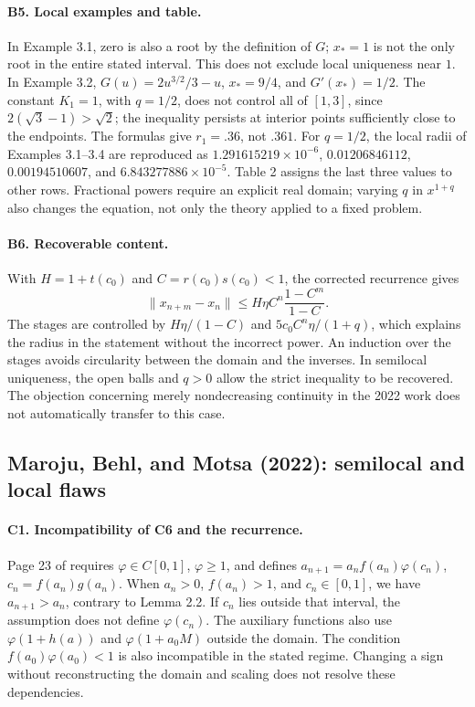 \documentclass[11pt,a4paper]{article}
\numberwithin{equation}{section}
\numberwithin{table}{section}
\theoremstyle{plain}
\theoremstyle{definition}\newtheorem{definition}[theorem]{Definition}
\theoremstyle{remark}\newtheorem{remark}[theorem]{Remark}
\begin{document}
\paragraph{B5. Local examples and table.}
In Example 3.1, zero is also a root by the definition of $G$;
$x_*=1$ is not the only root in the entire stated interval. This does
not exclude local uniqueness near $1$. In Example 3.2,
$G(u)=2u^{3/2}/3-u$, $x_*=9/4$, and $G'(x_*)=1/2$.
The constant $K_1=1$, with $q=1/2$, does not control all of $[1,3]$,
since $2(\sqrt3-1)>\sqrt2$; the inequality persists at interior points
sufficiently close to the endpoints. The formulas give $r_1=.36$,
not $.361$.
For $q=1/2$, the local radii of Examples 3.1--3.4 are reproduced as
$1.291615219\times10^{-6}$, $0.01206846112$, $0.00194510607$, and
$6.843277886\times10^{-5}$. Table 2 assigns the last three values
to other rows. Fractional powers require an explicit real domain;
varying $q$ in $x^{1+q}$ also changes the equation, not only the theory
applied to a fixed problem.

\paragraph{B6. Recoverable content.}
With $H=1+t(c_0)$ and $C=r(c_0)s(c_0)<1$, the corrected recurrence gives
\[
 \|x_{n+m}-x_n\|\leq H\eta C^n\frac{1-C^m}{1-C}.
\]
The stages are controlled by $H\eta/(1-C)$ and
$5c_0C^n\eta/(1+q)$, which explains the radius in the statement
without the incorrect power. An induction over the stages avoids
circularity between the domain and the inverses. In semilocal
uniqueness, the open balls and $q>0$ allow the strict inequality to be
recovered. The objection concerning merely nondecreasing continuity
in the 2022 work does not automatically transfer to this case.

\subsection{Maroju, Behl, and Motsa (2022): semilocal and local flaws}
\paragraph{C1. Incompatibility of C6 and the recurrence.}
Page 23 of \cite{MarojuBehlMotsa2022} requires
$\varphi\in C[0,1]$, $\varphi\geq1$, and defines
$a_{n+1}=a_nf(a_n)\varphi(c_n)$, $c_n=f(a_n)g(a_n)$.
When $a_n>0$, $f(a_n)>1$, and $c_n\in[0,1]$, we have
$a_{n+1}>a_n$, contrary to Lemma 2.2. If $c_n$ lies outside that
interval, the assumption does not define $\varphi(c_n)$.
The auxiliary functions also use $\varphi(1+h(a))$ and
$\varphi(1+a_0M)$ outside the domain. The condition
$f(a_0)\varphi(a_0)<1$ is also incompatible in the stated regime.
Changing a sign without reconstructing the domain and scaling does
not resolve these dependencies.
\end{document}
